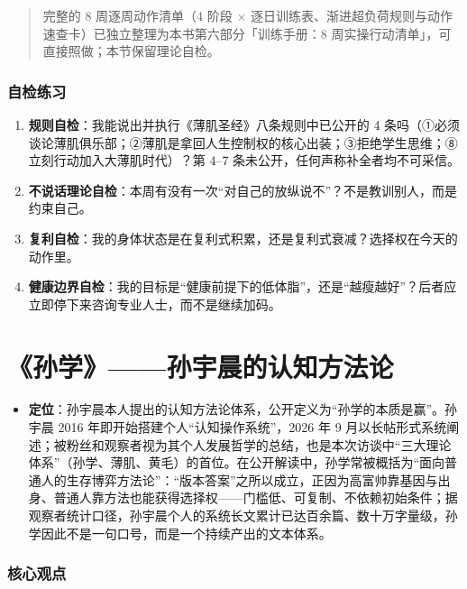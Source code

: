 \begin{quote}
完整的 8 周逐周动作清单（4 阶段 ×
逐日训练表、渐进超负荷规则与动作速查卡）已独立整理为本书第六部分「训练手册：8
周实操行动清单」，可直接照做；本节保留理论自检。
\end{quote}

\subsubsection{自检练习}

\begin{enumerate}
\def\labelenumi{\arabic{enumi}.}
\tightlist
\item
  \textbf{规则自检}：我能说出并执行《薄肌圣经》八条规则中已公开的 4
  条吗（①必须谈论薄肌俱乐部；②薄肌是拿回人生控制权的核心出装；③拒绝学生思维；⑧立刻行动加入大薄肌时代）？第
  4--7 条未公开，任何声称补全者均不可采信。
\item
  \textbf{不说话理论自检}：本周有没有一次``对自己的放纵说不''？不是教训别人，而是约束自己。
\item
  \textbf{复利自检}：我的身体状态是在复利式积累，还是复利式衰减？选择权在今天的动作里。
\item
  \textbf{健康边界自检}：我的目标是``健康前提下的低体脂''，还是``越瘦越好''？后者应立即停下来咨询专业人士，而不是继续加码。
\end{enumerate}

\section{《孙学》------孙宇晨的认知方法论}

\begin{itemize}
\tightlist
\item
  \textbf{定位}：孙宇晨本人提出的认知方法论体系，公开定义为``孙学的本质是赢''。孙宇晨
  2016 年即开始搭建个人``认知操作系统''，2026 年 9
  月以长帖形式系统阐述；被粉丝和观察者视为其个人发展哲学的总结，也是本次访谈中``三大理论体系''（孙学、薄肌、黄毛）的首位。在公开解读中，孙学常被概括为``面向普通人的生存博弈方法论''：``版本答案''之所以成立，正因为高富帅靠基因与出身、普通人靠方法也能获得选择权------门槛低、可复制、不依赖初始条件；据观察者统计口径，孙宇晨个人的系统长文累计已达百余篇、数十万字量级，孙学因此不是一句口号，而是一个持续产出的文本体系。
\end{itemize}

\subsubsection*{核心观点}

